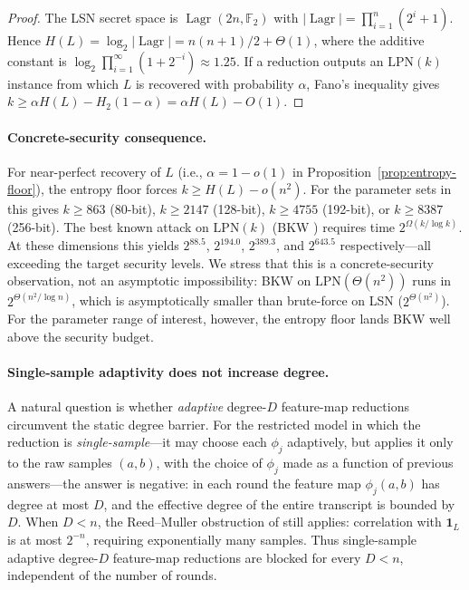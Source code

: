 \documentclass[11pt,a4paper]{article}
\theoremstyle{plain}
\theoremstyle{definition}
\newcommand{\F}{\mathbb{F}}
\DeclareMathOperator{\Lagr}{Lagr}
\begin{document}
\begin{proof}
The LSN secret space is $\Lagr(2n,\F_2)$ with $|\Lagr| = \prod_{i=1}^n (2^i+1)$. Hence $H(L) = \log_2|\Lagr| = n(n+1)/2 + \Theta(1)$, where the additive constant is $\log_2\prod_{i=1}^{\infty}(1+2^{-i}) \approx 1.25$. If a reduction outputs an $\mathrm{LPN}(k)$ instance from which $L$ is recovered with probability $\alpha$, Fano's inequality gives $k \geq \alpha H(L) - H_2(1-\alpha) = \alpha H(L) - O(1)$.
\end{proof}

\paragraph{Concrete-security consequence.} For near-perfect recovery of $L$ (i.e., $\alpha=1-o(1)$ in Proposition~\ref{prop:entropy-floor}), the entropy floor forces $k \geq H(L)-o(n^2)$. For the parameter sets in  this gives $k \geq 863$ (80-bit), $k \geq 2147$ (128-bit), $k \geq 4755$ (192-bit), or $k \geq 8387$ (256-bit). The best known attack on $\mathrm{LPN}(k)$ (BKW \cite{BKW03}) requires time $2^{\Omega(k/\log k)}$. At these dimensions this yields $2^{88.5}$, $2^{194.0}$, $2^{389.3}$, and $2^{643.5}$ respectively---all exceeding the target security levels. We stress that this is a concrete-security observation, not an asymptotic impossibility: BKW on $\mathrm{LPN}(\Theta(n^2))$ runs in $2^{\Theta(n^2/\log n)}$, which is asymptotically smaller than brute-force on LSN ($2^{\Theta(n^2)}$). For the parameter range of interest, however, the entropy floor lands BKW well above the security budget.

\paragraph{Single-sample adaptivity does not increase degree.} A natural question is whether \emph{adaptive} degree-$D$ feature-map reductions circumvent the static degree barrier. For the restricted model in which the reduction is \emph{single-sample}---it may choose each $\phi_j$ adaptively, but applies it only to the raw samples $(a,b)$, with the choice of $\phi_j$ made as a function of previous answers---the answer is negative: in each round the feature map $\phi_j(a,b)$ has degree at most $D$, and the effective degree of the entire transcript is bounded by $D$. When $D < n$, the Reed--Muller obstruction of  still applies: correlation with $\mathbf{1}_L$ is at most $2^{-n}$, requiring exponentially many samples. Thus single-sample adaptive degree-$D$ feature-map reductions are blocked for every $D < n$, independent of the number of rounds.
\end{document}

